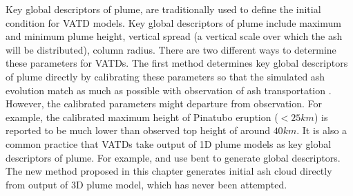 Key global descriptors of plume, are traditionally used to define the initial condition for VATD models. Key global descriptors of plume include maximum and minimum plume height, vertical spread (a vertical scale over which the ash will be distributed), column radius. There are two different ways to determine these parameters for VATDs. The first method determines key global descriptors of plume directly by calibrating these parameters so that the simulated ash evolution match as much as possible with observation of ash transportation \citep[e.g.][]{fero2008simulation,fero2009simulating}. However, the calibrated parameters might departure from observation. For example, the calibrated maximum height of Pinatubo eruption ($<25 km$) is reported to be much lower \citep{fero2009simulating} than observed top height of around $40 km$. It is also a common practice that VATDs take output of 1D plume models as key global descriptors of plume. For example, \citet{bursik2012estimation} and \citet{ stefanescu2014temporal} use bent \citep{bursik2001effect} to generate global descriptors. The new method proposed in this chapter generates initial ash cloud directly from output of 3D plume model, which has never been attempted.
%
